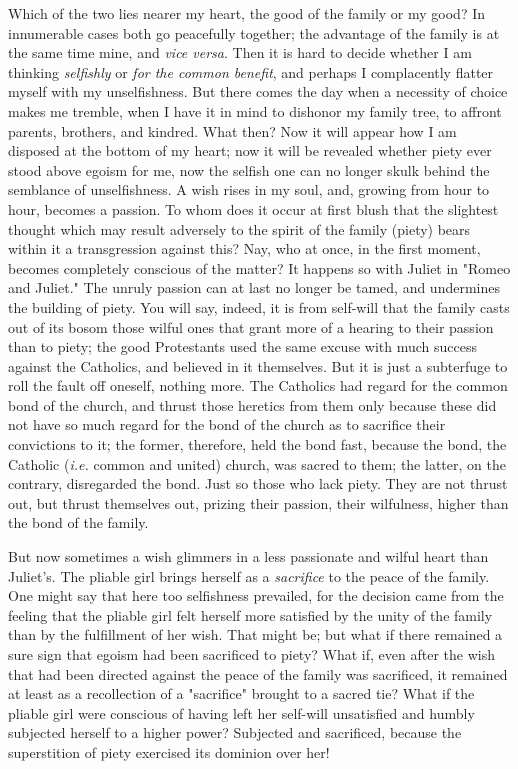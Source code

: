 \documentclass[a4paper]{book}
\begin{document}
Which of the two lies nearer my heart, the good of the family or my good? In 
innumerable cases both go peacefully together; the advantage of the family is 
at the same time mine, and \textit{vice versa}. Then it is hard to decide 
whether I am thinking \textit{selfishly} or \textit{for the common benefit}, 
and perhaps I complacently flatter myself with my unselfishness. But there 
comes the day when a necessity of choice makes me tremble, when I have it in 
mind to dishonor my family tree, to affront parents, brothers, and kindred. 
What then? Now it will appear how I am disposed at the bottom of my heart; now 
it will be revealed whether piety ever stood above egoism for me, now the 
selfish one can no longer skulk behind the semblance of unselfishness. A wish 
rises in my soul, and, growing from hour to hour, becomes a passion. To whom 
does it occur at first blush that the slightest thought which may result 
adversely to the spirit of the family (piety) bears within it a transgression 
against this? Nay, who at once, in the first moment, becomes completely 
conscious of the matter? It happens so with Juliet in "{}Romeo and Juliet."{} 
The unruly passion can at last no longer be tamed, and undermines the building 
of piety. You will say, indeed, it is from self-will that the family casts out 
of its bosom those wilful ones that grant more of a hearing to their passion 
than to piety; the good Protestants used the same excuse with much success 
against the Catholics, and believed in it themselves. But it is just a 
subterfuge to roll the fault off oneself, nothing more. The Catholics had 
regard for the common bond of the church, and thrust those heretics from them 
only because these did not have so much regard for the bond of the church as 
to sacrifice their convictions to it; the former, therefore, held the bond 
fast, because the bond, the Catholic (\textit{i.e.} common and united) church, 
was sacred to them; the latter, on the contrary, disregarded the bond. Just so 
those who lack piety. They are not thrust out, but thrust themselves out, 
prizing their passion, their wilfulness, higher than the bond of the family.

But now sometimes a wish glimmers in a less passionate and wilful heart than 
Juliet's. The pliable girl brings herself as a \textit{sacrifice} to the peace 
of the family. One might say that here too selfishness prevailed, for the 
decision came from the feeling that the pliable girl felt herself more 
satisfied by the unity of the family than by the fulfillment of her wish. That 
might be; but what if there remained a sure sign that egoism had been 
sacrificed to piety? What if, even after the wish that had been directed 
against the peace of the family was sacrificed, it remained at least as a 
recollection of a "{}sacrifice"{} brought to a sacred tie? What if the pliable 
girl were conscious of having left her self-will unsatisfied and humbly 
subjected herself to a higher power? Subjected and sacrificed, because the 
superstition of piety exercised its dominion over her!
\end{document}
